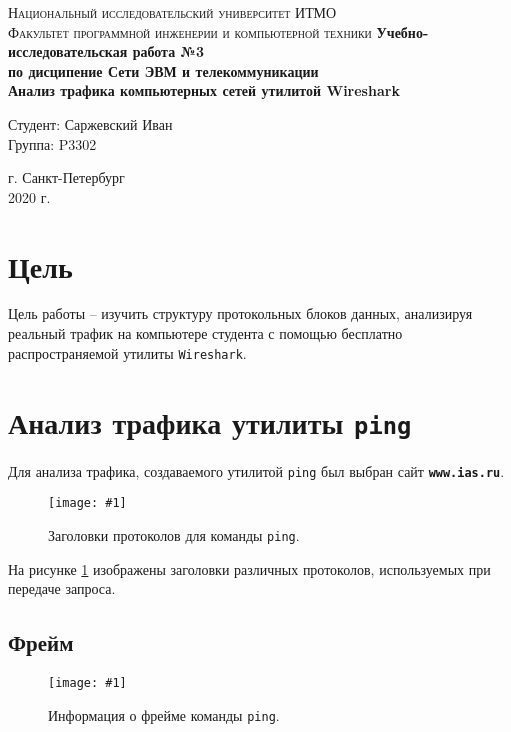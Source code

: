 \documentclass[12pt, a4paper]{article}
\newcommand{\figc}[4]{
  \begin{figure}[h]
  \begin{center}
    \texttt{[image: \#1]}
    \caption{#2}
    \label{fig:#3}
  \end{center}
  \end{figure}
}
\begin{document}
\begin{titlepage}
\begin{center}

\textsc{Национальный исследовательский университет ИТМО\\[4mm]
Факультет программной инженерии и компьютерной техники}
\vfill
\textbf{Учебно-исследовательская работа №3\\[4mm]
по дисципение Сети ЭВМ и телекоммуникации\\[4mm]
Анализ трафика компьютерных сетей утилитой Wireshark\\[16mm]
}
\begin{flushright}
Студент: Саржевский Иван
\\[2mm]Группа: P3302
\end{flushright}
\vfill
г. Санкт-Петербург\\[2mm]
2020 г.

\end{center}
\end{titlepage}

\tableofcontents
\newpage

\justify

\section{Цель}

Цель работы – изучить структуру протокольных блоков данных, анализируя реальный
трафик на компьютере студента с помощью бесплатно распространяемой утилиты
\texttt{Wireshark}.

\section{Анализ трафика утилиты \texttt{ping}}

Для анализа трафика, создаваемого утилитой \texttt{ping} был выбран сайт
\textbf{\texttt{www.ias.ru}}.

\figc{ping_headers}{Заголовки протоколов для команды \texttt{ping}.}{p_h}{3.0}

На рисунке \ref{fig:p_h} изображены заголовки различных протоколов, используемых
при передаче запроса.

\subsection{Фрейм}

\figc{ping_frame}{Информация о фрейме команды \texttt{ping}.}{p_f}{3.0}
\end{document}
